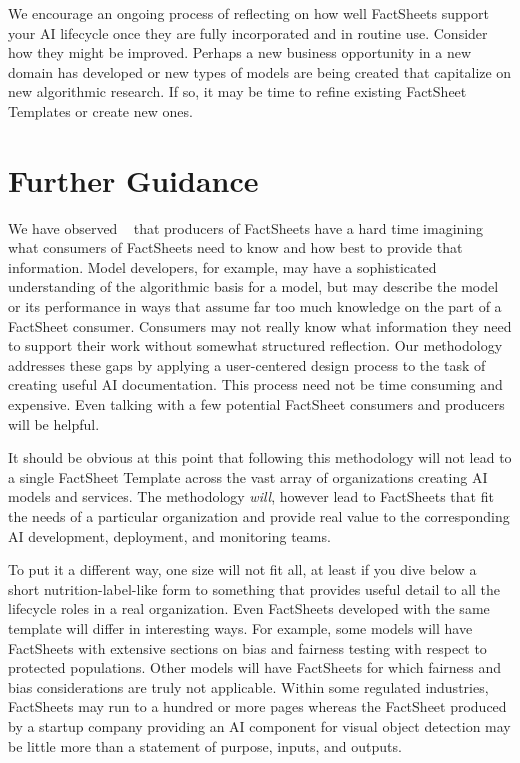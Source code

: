 \documentclass[11pt,dvipdfm]{article}
\begin{document}
We encourage an ongoing process of reflecting on how well FactSheets support your AI lifecycle once they are fully incorporated and in routine use. Consider how they might be improved. Perhaps a new business opportunity in a new domain has developed or new types of models are being created that capitalize on new algorithmic research. If so, it may be time to refine existing FactSheet Templates or create new ones.

\section{Further Guidance}
\label{sec-final}

We have observed ~\cite{experiences-2020} that producers of FactSheets have a hard time imagining what consumers of FactSheets need to know and how best to provide that information. Model developers, for example, may have a sophisticated understanding of the algorithmic basis for a model, but may describe the model or its performance in ways that assume far too much knowledge on the part of a FactSheet consumer. Consumers may not really know what information they need to support their work without somewhat structured reflection. Our methodology addresses these gaps by applying a user-centered design process \cite{mao2005} to the task of creating useful AI documentation. This process need not be time consuming and expensive. Even talking with a few potential FactSheet consumers and producers will be helpful.

It should be obvious at this point that following this methodology will not lead to a single FactSheet Template across the vast array of organizations creating AI models and services. The methodology \textit{will}, however lead to FactSheets that fit the needs of a particular organization and provide real value to the corresponding AI development, deployment, and monitoring teams.

To put it a different way, one size will not fit all, at least if you dive below a short nutrition-label-like form to something that provides useful detail to all the lifecycle roles in a real organization. Even FactSheets developed with the same template will differ in interesting ways. For example, some models will have FactSheets with extensive sections on bias and fairness testing with respect to protected populations. Other models will have FactSheets for which fairness and bias considerations are truly not applicable. Within some regulated industries, FactSheets may run to a hundred or more pages whereas the FactSheet produced by a startup company providing an AI component for visual object detection may be little more than a statement of purpose, inputs, and outputs.
\end{document}
